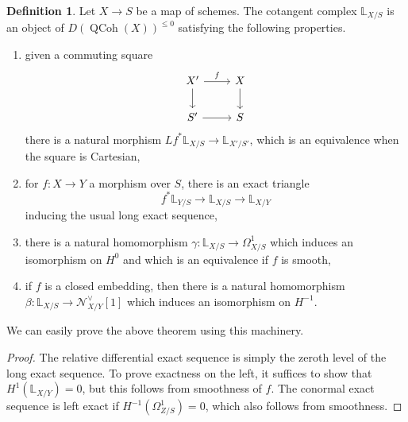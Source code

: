 \documentclass[10pt]{article}
\newtheorem{prop}[thm]{Proposition}
\theoremstyle{definition}
\newtheorem{defn}[thm]{Definition}
\DeclareMathOperator{\QCoh}{QCoh}
\begin{document}
\begin{defn}
Let $X \rightarrow S$ be a map of schemes.  The cotangent complex $\mathbb{L}_{X/S}$ is an object of $D(\QCoh(X))^{\leq 0}$ satisfying the following properties.
\begin{enumerate}
\item given a commuting square
$$\begin{tikzcd}
X' \arrow[r, "f"] \arrow[d] & X \arrow[d] \\
S' \arrow[r] & S
\end{tikzcd}$$
there is a natural morphism $Lf^* \mathbb{L}_{X/S} \rightarrow \mathbb{L}_{X'/S'}$, which is an equivalence when the square is Cartesian,
\item for $f: X \rightarrow Y$ a morphism over $S$, there is an exact triangle
$$f^* \mathbb{L}_{Y/S} \rightarrow \mathbb{L}_{X/S} \rightarrow \mathbb{L}_{X/Y}$$
inducing the usual long exact sequence,
\item there is a natural homomorphism $\gamma: \mathbb{L}_{X/S} \rightarrow \Omega^1_{X/S}$ which induces an isomorphism on $H^0$ and which is an equivalence if $f$ is smooth,
\item if $f$ is a closed embedding, then there is a natural homomorphism $\beta: \mathbb{L}_{X/S} \rightarrow \mathcal{N}^\vee_{X/Y}[1]$ which induces an isomorphism on $H^{-1}$.
\end{enumerate}
\end{defn}

We can easily prove the above theorem using this machinery.
\begin{proof}
The relative differential exact sequence is simply the zeroth level of the long exact sequence.  To prove exactness on the left, it suffices to show that $H^1(\mathbb{L}_{X/Y}) = 0$, but this follows from smoothness of $f$.  The conormal exact sequence is left exact if $H^{-1}(\Omega^1_{Z/S}) = 0$, which also follows from smoothness.
\end{proof}

%
%
\end{document}
